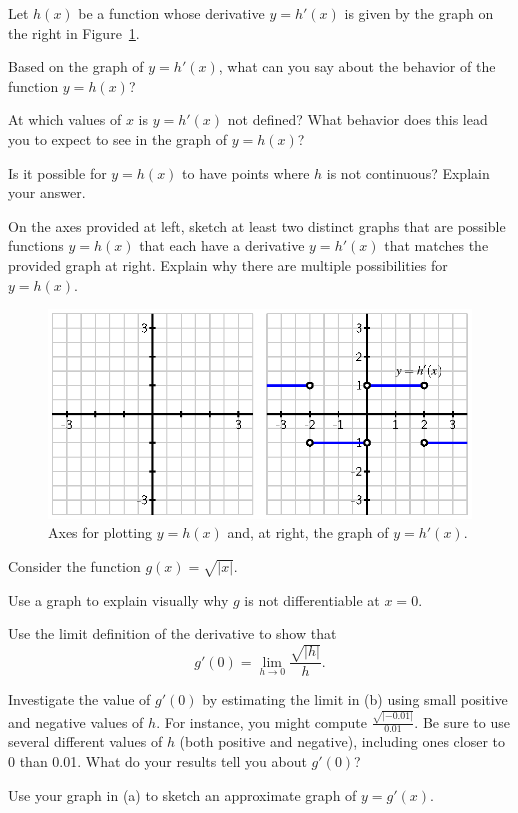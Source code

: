 \begin{exercises}
\item Let $h(x)$ be a function whose derivative $y= h'(x)$ is given by the graph on the right in Figure~\ref{F:1.7.Ez3}.
	\ba
		\item Based on the graph of $y = h'(x)$, what can you say about the behavior of the function $y = h(x)$?
		\item At which values of $x$ is $y = h'(x)$ not defined?  What behavior does this lead you to expect to see in the graph of $y=h(x)$?
		\item Is it possible for $y = h(x)$ to have points where $h$ is not continuous?  Explain your answer.
		\item On the axes provided at left, sketch at least two distinct graphs that are possible functions $y = h(x)$ that each have a derivative $y = h'(x)$ that matches the provided graph at right.  Explain why there are multiple possibilities for $y = h(x)$.
	\ea
\begin{figure}[h]
  \begin{center}
 \includegraphics{figures/1_7_Ez3.eps} %
   \end{center}
   \caption{Axes for plotting $y = h(x)$ and, at right, the graph of $y = h'(x)$.} \label{F:1.7.Ez3}
\end{figure}

\item Consider the function $g(x) = \sqrt{|x|}$.
	\ba
		\item Use a graph to explain visually why $g$ is not differentiable at $x = 0$.
		\item Use the limit definition of the derivative to show that
		$$g'(0) = \lim_{h \to 0} \frac{\sqrt{|h|}}{h}.$$
		\item Investigate the value of $g'(0)$ by estimating the limit in (b) using small positive and negative values of $h$.  For instance, you might compute $\frac{\sqrt{|-0.01|}}{0.01}$.  Be sure to use several different values of $h$ (both positive and negative), including ones closer to 0 than 0.01.  What do your results tell you about $g'(0)$?
		\item Use your graph in (a) to sketch an approximate graph of $y = g'(x)$.  
	\ea

\end{exercises}
\afterexercises